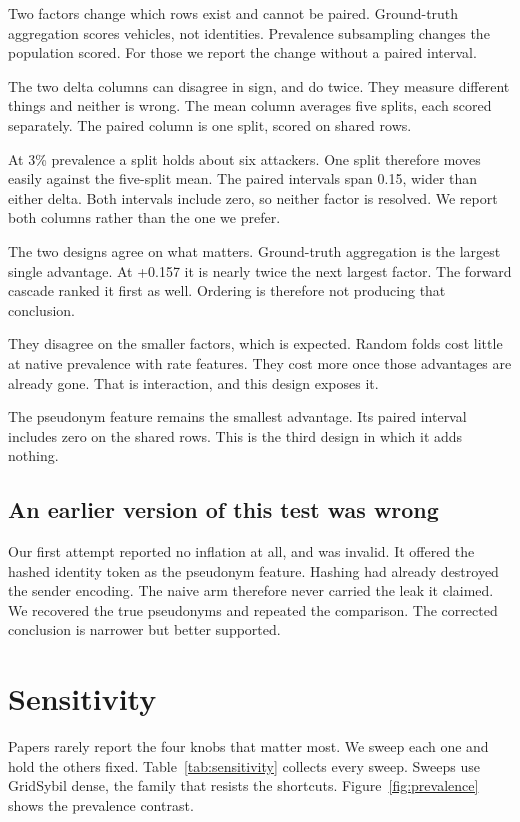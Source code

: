 \documentclass[conference]{IEEEtran}
\begin{document}
Two factors change which rows exist and cannot be paired.
Ground-truth aggregation scores vehicles, not identities.
Prevalence subsampling changes the population scored.
For those we report the change without a paired interval.

The two delta columns can disagree in sign, and do twice.
They measure different things and neither is wrong.
The mean column averages five splits, each scored separately.
The paired column is one split, scored on shared rows.

At 3\% prevalence a split holds about six attackers.
One split therefore moves easily against the five-split mean.
The paired intervals span 0.15, wider than either delta.
Both intervals include zero, so neither factor is resolved.
We report both columns rather than the one we prefer.

The two designs agree on what matters.
Ground-truth aggregation is the largest single advantage.
At +0.157 it is nearly twice the next largest factor.
The forward cascade ranked it first as well.
Ordering is therefore not producing that conclusion.

They disagree on the smaller factors, which is expected.
Random folds cost little at native prevalence with rate features.
They cost more once those advantages are already gone.
That is interaction, and this design exposes it.

The pseudonym feature remains the smallest advantage.
Its paired interval includes zero on the shared rows.
This is the third design in which it adds nothing.

\subsection{An earlier version of this test was wrong}

Our first attempt reported no inflation at all, and was invalid.
It offered the hashed identity token as the pseudonym feature.
Hashing had already destroyed the sender encoding.
The naive arm therefore never carried the leak it claimed.
We recovered the true pseudonyms and repeated the comparison.
The corrected conclusion is narrower but better supported.

\section{Sensitivity}
\label{sec:sensitivity}

Papers rarely report the four knobs that matter most.
We sweep each one and hold the others fixed.
Table~\ref{tab:sensitivity} collects every sweep.
Sweeps use GridSybil dense, the family that resists the shortcuts.
Figure~\ref{fig:prevalence} shows the prevalence contrast.
\end{document}
